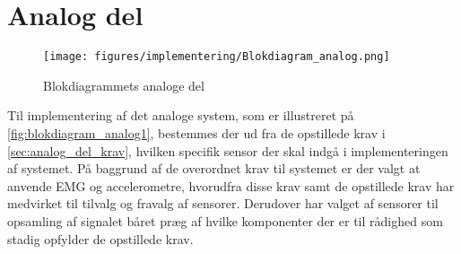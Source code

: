 \section{Analog del}
\begin{figure}[H]
\centering
\texttt{[image: figures/implementering/Blokdiagram\_analog.png]}
\caption{Blokdiagrammets analoge del}
\label{fig:blokdiagram_analog1}
\end{figure}

\noindent
Til implementering af det analoge system, som er illustreret på \autoref{fig:blokdiagram_analog1}, bestemmes der ud fra de opstillede krav i \autoref{sec:analog_del_krav}, hvilken specifik sensor der skal indgå i implementeringen af systemet. På baggrund af de overordnet krav til systemet er der valgt at anvende EMG og accelerometre, hvorudfra disse krav samt de opstillede krav har medvirket til tilvalg og fravalg af sensorer. Derudover har valget af sensorer til opsamling af signalet båret præg af hvilke komponenter der er til rådighed som stadig opfylder de opstillede krav. 




